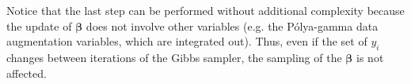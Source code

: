 Notice that the last step can be performed without additional complexity because the update of $\bm{\beta}$ does not involve other variables (e.g. the P\'olya-gamma data augmentation variables, which are integrated out). Thus, even if the set of $y_i$ changes between iterations of the Gibbs sampler, the sampling of the $\bm{\beta}$ is not affected.















